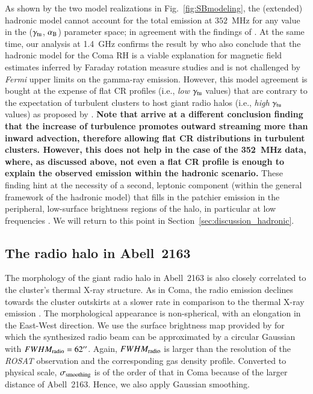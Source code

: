 \documentclass[useAMS,usenatbib]{mn2e}
\begin{document}
As shown by the two model realizations in Fig.~\ref{fig:SBmodeling}, the
(extended) hadronic model cannot account for the total emission at $352$~MHz for
any value in the ($\gamma_{{\mathrm{tu}}}$, $\alpha_{{\mathrm{B}}}$) parameter space; in
agreement with the findings of \citet{2012arXiv1207.3025B}. At the same time,
our analysis at 1.4~GHz confirms the result by \citet{2012...VERITAS} who also
conclude that the hadronic model for the Coma RH is a viable explanation for
magnetic field estimates inferred by Faraday rotation measure studies
\citep{2010A&A...513A..30B} and is not challenged by {\em Fermi} upper limits on
the gamma-ray emission. However, this model agreement is bought at the expense
of flat CR profiles (i.e., {\em low} $\gamma_{{\mathrm{tu}}}$ values) that are
contrary to the expectation of turbulent clusters to host giant radio halos
(i.e., {\em high} $\gamma_{{\mathrm{tu}}}$ values) as proposed by
\citet{2011A&A...527A..99E}. {\bf Note that \cite{2013arXiv1303.4746W} 
arrive at a different conclusion finding that the increase of turbulence promotes 
outward streaming more than inward advection, therefore allowing flat CR 
distributions in turbulent clusters. However, this does not help in
the case of the 352~MHz data, where, as discussed above, not even a
flat CR profile is enough to explain the observed emission within the
hadronic scenario.} These finding hint at the necessity of a second,
leptonic component (within the general framework of the hadronic model) that
fills in the patchier emission in the peripheral, low-surface brightness regions
of the halo, in particular at low frequencies \cite[see Fig.~3
of][]{2011MNRAS.412....2B}. We will return to this point in
Section~\ref{sec:discussion_hadronic}.


\subsection{The radio halo in Abell~2163}

The morphology of the giant radio halo in Abell~2163 is also closely correlated
to the cluster's thermal X-ray structure. As in Coma, the radio emission declines
towards the cluster outskirts at a slower rate in comparison to the thermal
X-ray emission \citep{2001A&A...373..106F}. The morphological appearance is
non-spherical, with an elongation in the East-West direction. We use the surface
brightness map provided by \citet{2009A&A...499..679M} for which the synthesized
radio beam can be approximated by a circular Gaussian with
$FWHM_{{\mathrm{radio}}}=62\hbox{$^{\prime\prime}$}$.  Again, $FWHM_{{\mathrm{radio}}}$ is larger than the
resolution of the \emph{ROSAT} observation and the corresponding gas density
profile. Converted to physical scale, $\sigma_{{\mathrm{smoothing}}}$ is of the order
of that in Coma because of the larger distance of Abell~2163. Hence, we also apply
Gaussian smoothing.
\end{document}
